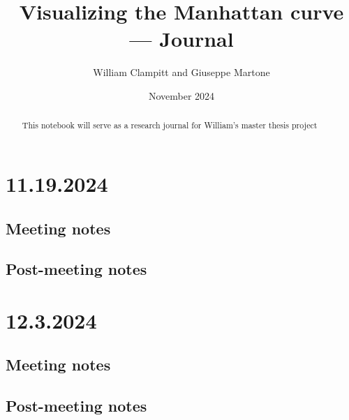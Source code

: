 \documentclass{article}
\title{Visualizing the Manhattan curve --- Journal}
\author{William Clampitt and Giuseppe Martone}
\date{November 2024}
\begin{document}
\maketitle
\begin{abstract}
    This notebook will serve as a research journal for William's master thesis project
\end{abstract}

\section{11.19.2024}
\subsection{Meeting notes}
\subsection{Post-meeting notes}

\section{12.3.2024}
\subsection{Meeting notes}
\subsection{Post-meeting notes}
\end{document}
